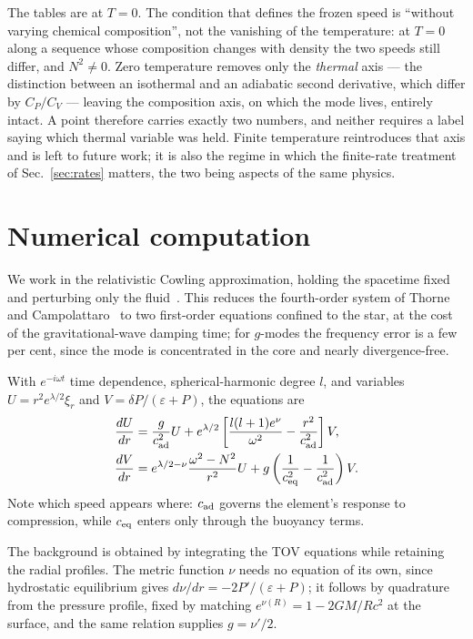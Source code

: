 \documentclass[aps,prd,twocolumn,superscriptaddress,nofootinbib,10pt]{revtex4-2}
\begin{document}
The tables are at $T=0$. The condition that defines the frozen speed is
``without varying chemical composition'', not the vanishing of the temperature:
at $T=0$ along a sequence whose composition changes with density the two speeds
still differ, and $N^{2}\neq0$. Zero temperature removes only the \emph{thermal}
axis --- the distinction between an isothermal and an adiabatic second
derivative, which differ by $C_{P}/C_{V}$ --- leaving the composition axis, on
which the mode lives, entirely intact. A point therefore carries exactly two
numbers, and neither requires a label saying which thermal variable was held.
Finite temperature reintroduces that axis and is left to future work; it is also
the regime in which the finite-rate treatment of Sec.~\ref{sec:rates} matters,
the two being aspects of the same physics.

\section{Numerical computation}

We work in the relativistic Cowling approximation, holding the spacetime fixed
and perturbing only the fluid~\cite{McDermott1983}. This reduces the
fourth-order system of Thorne and Campolattaro~\cite{ThorneCampolattaro1967} to
two first-order equations confined to the star, at the cost of the
gravitational-wave damping time; for $g$-modes the frequency error is a few per
cent, since the mode is concentrated in the core and nearly divergence-free.

With $e^{-i\omega t}$ time dependence, spherical-harmonic degree $l$, and
variables $U=r^{2}e^{\lambda/2}\xi_{r}$ and $V=\delta P/(\varepsilon+P)$, the
equations are~\cite{Jaikumar2021}
\begin{align}
  \frac{dU}{dr} &= \frac{g}{c_{\rm ad}^{2}}U
    + e^{\lambda/2}\left[\frac{l(l+1)e^{\nu}}{\omega^{2}}
      - \frac{r^{2}}{c_{\rm ad}^{2}}\right]V, \nonumber\\
  \frac{dV}{dr} &= e^{\lambda/2-\nu}\frac{\omega^{2}-N^{2}}{r^{2}}U
    + g\left(\frac{1}{c_{\rm eq}^{2}}-\frac{1}{c_{\rm ad}^{2}}\right)V.
  \label{eq:cowling}
\end{align}
Note which speed appears where: $c_{\rm ad}$ governs the element's response to
compression, while $c_{\rm eq}$ enters only through the buoyancy terms.

The background is obtained by integrating the TOV equations while retaining the
radial profiles. The metric function $\nu$ needs no equation of its own, since
hydrostatic equilibrium gives $d\nu/dr=-2P'/(\varepsilon+P)$; it follows by
quadrature from the pressure profile, fixed by matching $e^{\nu(R)}=1-2GM/Rc^{2}$
at the surface, and the same relation supplies $g=\nu'/2$.
\end{document}
